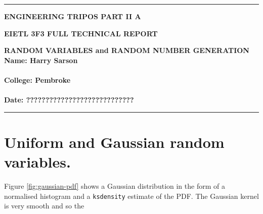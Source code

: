 \documentclass[12pt]{article}
\newcommand{\code}[1]{\texttt{#1}}
\begin{document}
\noindent
\rule{15.7cm}{0.5mm}


\begin{center}
{\bf ENGINEERING TRIPOS PART II A}
\end{center}
\vspace{0.5cm} {\bf EIETL \hfill 3F3 FULL TECHNICAL REPORT}
\vspace{0.5cm}
\begin{center}
{\bf RANDOM VARIABLES and RANDOM NUMBER GENERATION\\
Name: Harry Sarson \\\hfill\\
College: Pembroke \\\hfill
\\
Date: ????????????????????????????	
}
\end{center}
\rule{15.7cm}{0.5mm}

\pagebreak

\section{Uniform and Gaussian random variables.}

Figure \ref{fig:gaussian-pdf} shows a Gaussian distribution in the form of a normalised histogram and a \code{ksdensity} estimate of the PDF. The Gaussian kernel is very smooth and so the
\end{document}
